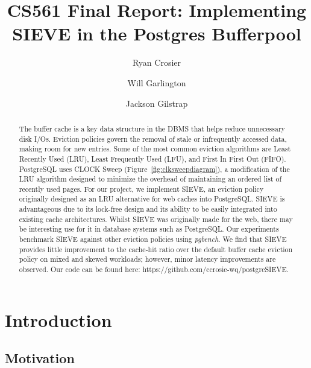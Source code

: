 \documentclass[sigconf]{acmart}
\begin{document}
\title{CS561 Final Report: Implementing SIEVE in the Postgres Bufferpool}

\author{Ryan Crosier}
\author{Will Garlington}
\author{Jackson Gilstrap}

\begin{abstract}
    The buffer cache is a key data structure in the DBMS that helps reduce unnecessary disk I/Os. Eviction policies govern the removal of stale or infrequently accessed data, making room for new entries. Some of the most common eviction algorithms are Least Recently Used (LRU), Least Frequently Used (LFU), and First In First Out (FIFO). PostgreSQL uses CLOCK Sweep \cite{pgclock} (Figure~\ref{fig:clksweepdiagram}), a modification of the LRU algorithm designed to minimize the overhead of maintaining an ordered list of recently used pages. For our project, we implement SIEVE, an eviction policy originally designed as an LRU alternative for web caches \cite{SIEVE} into PostgreSQL. SIEVE is advantageous due to its lock-free design and its ability to be easily integrated into existing cache architectures. Whilst SIEVE was originally made for the web, there may be interesting use for it in database systems such as PostgreSQL. Our experiments benchmark SIEVE against other eviction policies using \textit{pgbench}. We find that SIEVE provides little improvement to the cache-hit ratio over the default buffer cache eviction policy on mixed and skewed workloads; however, minor latency improvements are observed. Our code can be found here: https://github.com/ccrosie-wq/postgreSIEVE.
\end{abstract}

\maketitle

\section{Introduction}

\subsection{Motivation}
\end{document}
